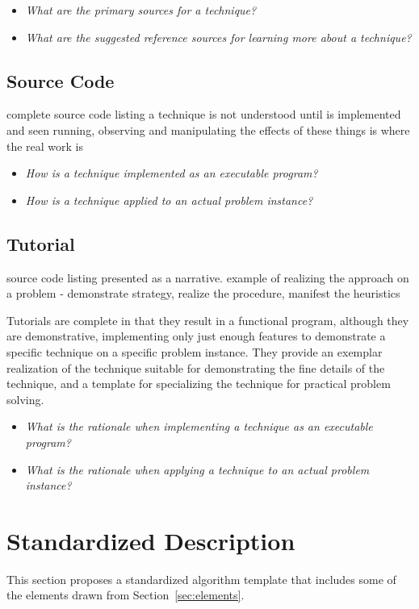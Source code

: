 \documentclass[a4paper, 11pt]{article}
\begin{document}
\begin{itemize}
	\item \emph{What are the primary sources for a technique?}
	\item \emph{What are the suggested reference sources for learning more about a technique?}
\end{itemize}

\subsection{Source Code}
complete source code listing
a technique is not understood until is implemented and seen running, observing and manipulating the effects of these things is where the real work is 

\begin{itemize}
	\item \emph{How is a technique implemented as an executable program?}
	\item \emph{How is a technique applied to an actual problem instance?}
\end{itemize}

\subsection{Tutorial}
source code listing presented as a narrative. example of realizing the approach on a problem - demonstrate strategy, realize the procedure, manifest the heuristics

Tutorials are complete in that they result in a functional program, although they are demonstrative, implementing only just enough features to demonstrate a specific technique on a specific problem instance. They provide an exemplar realization of the technique suitable for demonstrating the fine details of the technique, and a template for specializing the technique for practical problem solving. 

\begin{itemize}
	\item \emph{What is the rationale when implementing a technique as an executable program?}
	\item \emph{What is the rationale when applying a technique to an actual problem instance?}
\end{itemize}

\section{Standardized Description} 
\label{sec:template}
This section proposes a standardized algorithm template that includes some of the elements drawn from Section~\ref{sec:elements}.
\end{document}
